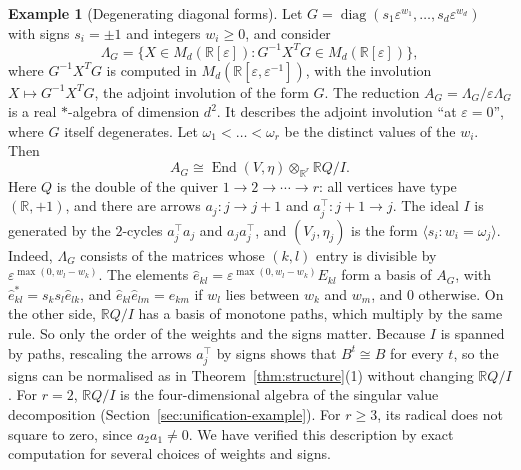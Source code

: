 \documentclass[12pt, a4paper]{report}
\theoremstyle{plain}
\theoremstyle{definition}
\newtheorem{example}[theorem]{Example}
\theoremstyle{remark}
\theoremstyle{plain}
\newcommand{\RR}{\mathbb{R}}
\DeclareMathOperator{\End}{End}
\DeclareMathOperator{\diag}{diag}
\begin{document}
\begin{example}[Degenerating diagonal forms]\label{ex:structure-degenerate}
Let $G=\diag(s_1\varepsilon^{w_1},\dots,s_d\varepsilon^{w_d})$ with signs $s_i=\pm1$ and integers $w_i\geq0$, and consider
\[ \Lambda_G=\{X\in M_d(\RR[\varepsilon]):G^{-1}X^TG\in M_d(\RR[\varepsilon])\}, \]
where $G^{-1}X^TG$ is computed in $M_d(\RR[\varepsilon,\varepsilon^{-1}])$, with the involution $X\mapsto G^{-1}X^TG$, the adjoint involution of the form $G$. The reduction $A_G=\Lambda_G/\varepsilon\Lambda_G$ is a real $*$-algebra of dimension $d^2$. It describes the adjoint involution ``at $\varepsilon=0$'', where $G$ itself degenerates. Let $\omega_1<\dots<\omega_r$ be the distinct values of the $w_i$. Then
\[ A_G\cong\End(V,\eta)\otimes_{\RR^r}\RR Q/I . \]
Here $Q$ is the double of the quiver $1\to2\to\cdots\to r$: all vertices have type $(\RR,+1)$, and there are arrows $a_j:j\to j+1$ and $a_j^{\top}:j+1\to j$. The ideal $I$ is generated by the $2$-cycles $a_j^{\top}a_j$ and $a_ja_j^{\top}$, and $(V_j,\eta_j)$ is the form $\langle s_i:w_i=\omega_j\rangle$. Indeed, $\Lambda_G$ consists of the matrices whose $(k,l)$ entry is divisible by $\varepsilon^{\max(0,w_l-w_k)}$. The elements $\hat e_{kl}=\varepsilon^{\max(0,w_l-w_k)}E_{kl}$ form a basis of $A_G$, with $\hat e_{kl}^*=s_ks_l\hat e_{lk}$, and $\hat e_{kl}\hat e_{lm}=\hat e_{km}$ if $w_l$ lies between $w_k$ and $w_m$, and $0$ otherwise. On the other side, $\RR Q/I$ has a basis of monotone paths, which multiply by the same rule. So only the order of the weights and the signs matter. Because $I$ is spanned by paths, rescaling the arrows $a_j^{\top}$ by signs shows that $B^t\cong B$ for every $t$, so the signs can be normalised as in Theorem~\ref{thm:structure}(1) without changing $\RR Q/I$. For $r=2$, $\RR Q/I$ is the four-dimensional algebra of the singular value decomposition (Section~\ref{sec:unification-example}). For $r\geq3$, its radical does not square to zero, since $a_2a_1\neq0$. We have verified this description by exact computation for several choices of weights and signs.
\end{example}
\end{document}
